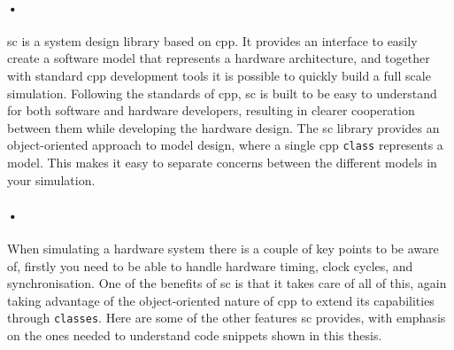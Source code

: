 \documentclass[a4paper, 12pt, openright, twoside]{report}
\newcommand{\codeword}[1]{\texttt{#1}}
\begin{document}
\paragraph{•}
\gls{sc} is a system design library based on \gls{cpp}\cite{systemc}.
It provides an interface to easily create a software model that represents a hardware architecture, and together with standard \gls{cpp} development tools it is possible to quickly build a full scale simulation.
Following the standards of \gls{cpp}, \gls{sc} is built to be easy to understand for both software and hardware developers, resulting in clearer cooperation between them while developing the hardware design.
The \gls{sc} library provides an object-oriented approach to model design, where a single \gls{cpp} \codeword{class} represents a model.
This makes it easy to separate concerns between the different models in your simulation.

\paragraph{•}
When simulating a hardware system there is a couple of key points to be aware of, firstly you need to be able to handle hardware timing, clock cycles, and synchronisation.
One of the benefits of \gls{sc} is that it takes care of all of this, again taking advantage of the object-oriented nature of \gls{cpp} to extend its capabilities through \codeword{classes}.
Here are some of the other features \gls{sc} provides, with emphasis on the ones needed to understand code snippets shown in this thesis.
\end{document}
